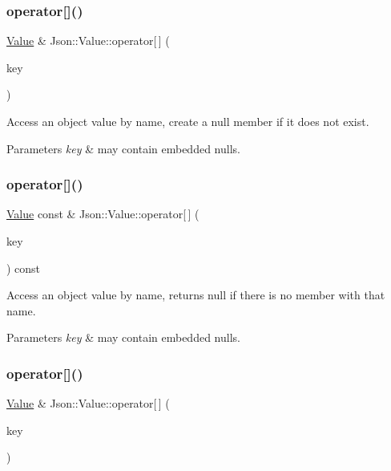 \subsubsection{\texorpdfstring{operator[]()}{operator[]()}\hspace{0.1cm}{\footnotesize\ttfamily [7/9]}}
{\footnotesize\ttfamily \hyperlink{classJson_1_1Value}{Value} \& Json\+::\+Value\+::operator\mbox{[}$\,$\mbox{]} (\begin{DoxyParamCaption}\item[{const J\+S\+O\+N\+C\+P\+P\+\_\+\+S\+T\+R\+I\+NG \&}]{key }\end{DoxyParamCaption})}

Access an object value by name, create a null member if it does not exist. 
\begin{DoxyParams}{Parameters}
{\em key} & may contain embedded nulls. \\
\hline
\end{DoxyParams}
\mbox{\label{classJson_1_1Value_aba60f69dcd85e935aa85e7a517e03427}} 
\subsubsection{\texorpdfstring{operator[]()}{operator[]()}\hspace{0.1cm}{\footnotesize\ttfamily [8/9]}}
{\footnotesize\ttfamily \hyperlink{classJson_1_1Value}{Value} const  \& Json\+::\+Value\+::operator\mbox{[}$\,$\mbox{]} (\begin{DoxyParamCaption}\item[{const J\+S\+O\+N\+C\+P\+P\+\_\+\+S\+T\+R\+I\+NG \&}]{key }\end{DoxyParamCaption}) const}

Access an object value by name, returns null if there is no member with that name. 
\begin{DoxyParams}{Parameters}
{\em key} & may contain embedded nulls. \\
\hline
\end{DoxyParams}
\mbox{\label{classJson_1_1Value_ac3763d7d315ca65dc188e273722f7955}} 
\subsubsection{\texorpdfstring{operator[]()}{operator[]()}\hspace{0.1cm}{\footnotesize\ttfamily [9/9]}}
{\footnotesize\ttfamily \hyperlink{classJson_1_1Value}{Value} \& Json\+::\+Value\+::operator\mbox{[}$\,$\mbox{]} (\begin{DoxyParamCaption}\item[{const \hyperlink{classJson_1_1StaticString}{Static\+String} \&}]{key }\end{DoxyParamCaption})}



